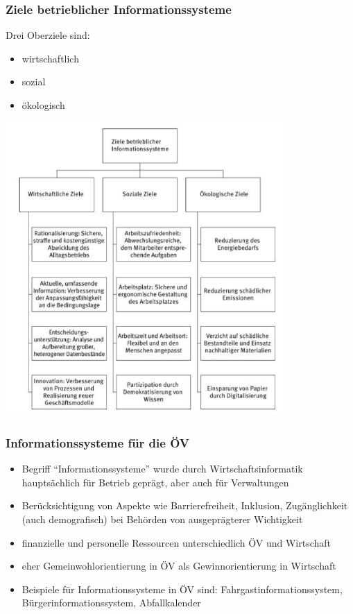 \subsubsection{Ziele betrieblicher Informationssysteme}
Drei Oberziele sind:
\begin{itemize}
  \item wirtschaftlich
  \item sozial
  \item ökologisch
\end{itemize}
\includegraphics[width=0.8\textwidth]{assets/ZielebetrieblicherInfosysteme.PNG}
\subsubsection{Informationssysteme für die ÖV}
\begin{itemize}
  \item Begriff “Informationssysteme” wurde durch Wirtschaftsinformatik hauptsächlich für Betrieb geprägt, aber auch für Verwaltungen
  \item Berücksichtigung von Aspekte wie Barrierefreiheit, Inklusion, Zugänglichkeit (auch demografisch) bei Behörden von ausgeprägterer Wichtigkeit
  \item finanzielle und personelle Ressourcen unterschiedlich ÖV und Wirtschaft
  \item eher Gemeinwohlorientierung in ÖV als Gewinnorientierung in Wirtschaft
  \item Beispiele für Informationssysteme in ÖV sind: Fahrgastinformationssystem, Bürgerinformationssystem, Abfallkalender
\end{itemize}

